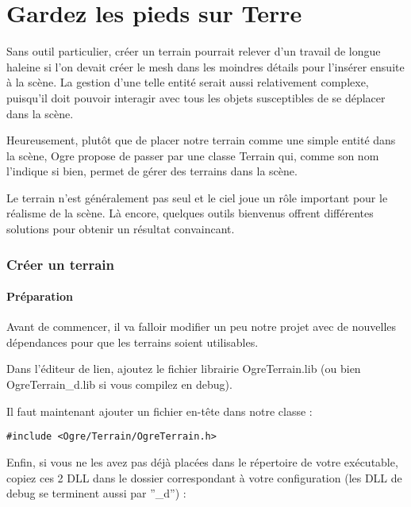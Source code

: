 \documentclass[10pt,a4paper]{report}
\begin{document}
\part{Gardez les pieds sur Terre}
Sans outil particulier, cr\'eer un terrain pourrait relever d'un travail de longue haleine si l'on devait cr\'eer le mesh dans les moindres d\'etails pour l'ins\'erer ensuite \`a la sc\`ene. La gestion d'une telle entit\'e serait aussi relativement complexe, puisqu'il doit pouvoir interagir avec tous les objets susceptibles de se d\'eplacer dans la sc\`ene.

Heureusement, plut\^ot que de placer notre terrain comme une simple entit\'e dans la sc\`ene, Ogre propose de passer par une classe Terrain qui, comme son nom l'indique si bien, permet de g\'erer des terrains dans la sc\`ene.

Le terrain n'est g\'en\'eralement pas seul et le ciel joue un r\^ole important pour le r\'ealisme de la sc\`ene. L\`a encore, quelques outils bienvenus offrent diff\'erentes solutions pour obtenir un r\'esultat convaincant.



\section{Cr\'eer un terrain}


\subsection{Pr\'eparation}

Avant de commencer, il va falloir modifier un peu notre projet avec de nouvelles d\'ependances pour que les terrains soient utilisables.

Dans l'\'editeur de lien, ajoutez le fichier librairie OgreTerrain.lib (ou bien OgreTerrain\_d.lib si vous compilez en debug).

Il faut maintenant ajouter un fichier en-t\^ete dans notre classe :

\begin{lstlisting}[caption={Ajout du fichier d'ent\^ete pour la gestion des terrains}]
#include <Ogre/Terrain/OgreTerrain.h>
\end{lstlisting}

Enfin, si vous ne les avez pas d\'ej\`a plac\'ees dans le r\'epertoire de votre ex\'ecutable, copiez ces 2 DLL dans le dossier correspondant \`a votre configuration (les DLL de debug se terminent aussi par ''\_d'') :
\end{document}
